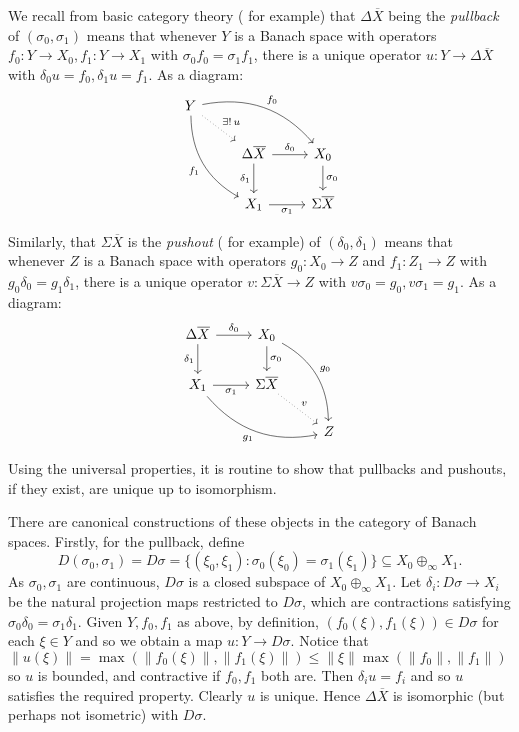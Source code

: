 \documentclass[a4paper,11pt]{article}
\theoremstyle{plain}
\theoremstyle{remark}
\begin{document}
We recall from basic category theory (\cite[Definition~5.1.16]{Leinster_BasicCatTheory} for example) that $\Delta\overline X$ being the \emph{pullback} of $(\sigma_0, \sigma_1)$ means that whenever $Y$ is a Banach space with operators $f_0 \colon Y \to X_0, f_1 \colon Y \to X_1$ with $\sigma_0 f_0 = \sigma_1 f_1$, there is a unique operator $u\colon Y \to \Delta\overline X$ with $\delta_0 u = f_0, \delta_1 u = f_1$.  As a diagram:
\[ \begin{tikzcd}
Y \arrow[rd, dotted, "\exists !\, u"] \arrow[rrd, bend left, "f_0"] \arrow[rdd, bend right, "f_1"']\\
& \Delta\overline X \arrow[r, "\delta_0"] \arrow[d, "\delta_1"'] & X_0 \arrow[d, "\sigma_0"] \\
& X_1 \arrow[r, "\sigma_1"'] & \Sigma\overline X
\end{tikzcd}
\]

Similarly, that $\Sigma\overline X$ is the \emph{pushout} (\cite[Definition~5.2.11]{Leinster_BasicCatTheory} for example) of $(\delta_0, \delta_1)$ means that whenever $Z$ is a Banach space with operators $g_0 \colon X_0 \to Z$ and $f_1 \colon Z_1\to Z$ with $g_0\delta_0 = g_1\delta_1$, there is a unique operator $v\colon \Sigma\overline X \to Z$ with $v\sigma_0 = g_0, v\sigma_1=g_1$.  As a diagram:
\[ \begin{tikzcd}
\Delta\overline X \arrow[r, "\delta_0"] \arrow[d, "\delta_1"'] & X_0 \arrow[d, "\sigma_0"] \arrow[rdd, bend left, "g_0"] \\
X_1 \arrow[r, "\sigma_1"'] \arrow[rrd, bend right, "g_1"'] & \Sigma\overline X \arrow[rd, dotted, "v"] \\
&& Z    
\end{tikzcd} \]

Using the universal properties, it is routine to show that pullbacks and pushouts, if they exist, are unique up to isomorphism.

There are canonical constructions of these objects in the category of Banach spaces.  Firstly, for the pullback, define
\[ D(\sigma_0,\sigma_1) = D\sigma = \{ (\xi_0,\xi_1) : \sigma_0(\xi_0) = \sigma_1(\xi_1) \} \subseteq X_0 \oplus_\infty X_1. \]
As $\sigma_0,\sigma_1$ are continuous, $D\sigma$ is a closed subspace of $X_0 \oplus_\infty X_1$.
Let $\delta_i \colon D\sigma \to X_i$ be the natural projection maps restricted to $D\sigma$, which are contractions satisfying $\sigma_0\delta_0 = \sigma_1\delta_1$.
Given $Y, f_0, f_1$ as above, by definition, $(f_0(\xi), f_1(\xi)) \in D\sigma$ for each $\xi\in Y$ and so we obtain a map $u \colon Y \to D\sigma$.  Notice that $\|u(\xi)\| = \max( \|f_0(\xi)\|, \|f_1(\xi)\| ) \leq \|\xi\| \max(\|f_0\|, \|f_1\|)$ so $u$ is bounded, and contractive if $f_0,f_1$ both are.  Then $\delta_i u = f_i$ and so $u$ satisfies the required property.  Clearly $u$ is unique.  Hence $\Delta\overline X$ is isomorphic (but perhaps not isometric) with $D\sigma$.
\end{document}
